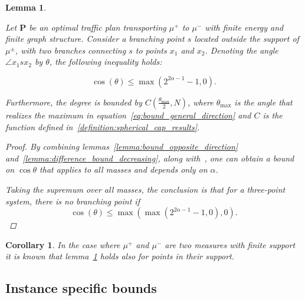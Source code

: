\documentclass[12pt,a4paper]{article}
\numberwithin{equation}{section}
\theoremstyle{mytheorem}
\newtheorem{lemma}[subsection]{Lemma}
\newtheorem{corollary}[subsection]{Corollary}
\theoremstyle{myremark}
\theoremstyle{myparagraph}
\begin{document}
    \begin{lemma}
        \label{lemma:bound_general_direction}

        Let $\mathbf{P}$ be an optimal traffic plan transporting $\mu^+$ to $\mu^-$ with finite energy and finite graph structure.
        Consider a branching point $s$ located outside the support of $\mu^{\pm}$, with two branches connecting $s$ to points $x_1$ and $x_2$.
        Denoting the angle $\angle x_1 s x_2$ by $\theta$, the following inequality holds:

        \begin{equation}
            \label{eq:bound_general_direction}
            \cos(\theta) \le \max\left( 2^{2\alpha - 1} - 1, 0 \right).
        \end{equation}

        Furthermore, the degree is bounded by $C \left( \frac{\theta_{\max}}{2}, N \right)$, where $\theta_{\max}$
        is the angle that realizes the maximum in equation~\ref{eq:bound_general_direction} and $C$ is the function defined in~\ref{definition:spherical_cap_results}.

        \begin{proof}
            By combining lemmas~\ref{lemma:bound_opposite_direction} and~\ref{lemma:difference_bound_decreasing}, along with~\cite[Lemma 12.5]{Bernot}, one can obtain a bound on $\cos \theta$ that applies to all masses and depends only on $\alpha$.

            Taking the supremum over all masses, the conclusion is that for a three-point system, there is no branching point if
            \begin{equation}
                \cos(\theta) \le \max \left( \max\left( 2^{2\alpha - 1} - 1, 0 \right), 0 \right).
            \end{equation}
        \end{proof}

    \end{lemma}

    \begin{corollary}
        In the case where $\mu^+$ and $\mu^-$ are two measures with finite support it is known that lemma~\ref{lemma:bound_general_direction}
        holds also for points in their support.
    \end{corollary}


    \subsection{Instance specific bounds}
\end{document}
